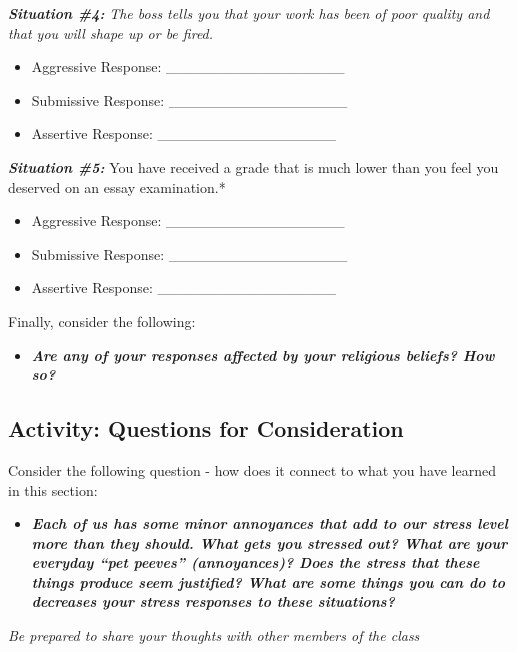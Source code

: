 \documentclass[
]{book}
\providecommand{\tightlist}{%
  \setlength{\itemsep}{0pt}\setlength{\parskip}{0pt}}
\begin{document}
\begin{reflect}
\textbf{\emph{Situation \#4:}} \emph{The boss tells you that your work has been of poor quality and that you will shape up or be fired.}

\begin{itemize}
\tightlist
\item
  Aggressive Response: \_\_\_\_\_\_\_\_\_\_\_\_\_\_\_\_\_\\
\item
  Submissive Response: \_\_\_\_\_\_\_\_\_\_\_\_\_\_\_\_\_\\
\item
  Assertive Response: \_\_\_\_\_\_\_\_\_\_\_\_\_\_\_\_\_
\end{itemize}

\textbf{\emph{Situation \#5:}} You have received a grade that is much lower than you feel you deserved on an essay examination.*

\begin{itemize}
\tightlist
\item
  Aggressive Response: \_\_\_\_\_\_\_\_\_\_\_\_\_\_\_\_\_\\
\item
  Submissive Response: \_\_\_\_\_\_\_\_\_\_\_\_\_\_\_\_\_\\
\item
  Assertive Response: \_\_\_\_\_\_\_\_\_\_\_\_\_\_\_\_\_
\end{itemize}

Finally, consider the following:

\begin{itemize}
\tightlist
\item
  \textbf{\emph{Are any of your responses affected by your religious beliefs? How so?}}
\end{itemize}
\end{reflect}

\hypertarget{activity-questions-for-consideration-15}{%
\subsection*{Activity: Questions for Consideration}\label{activity-questions-for-consideration-15}}

\begin{reflect}
Consider the following question - how does it connect to what you have learned in this section:

\begin{itemize}
\tightlist
\item
  \textbf{\emph{Each of us has some minor annoyances that add to our stress level more than they should. What gets you stressed out? What are your everyday ``pet peeves'' (annoyances)? Does the stress that these things produce seem justified? What are some things you can do to decreases your stress responses to these situations?}}
\end{itemize}

\emph{Be prepared to share your thoughts with other members of the class}
\end{reflect}
\end{document}
